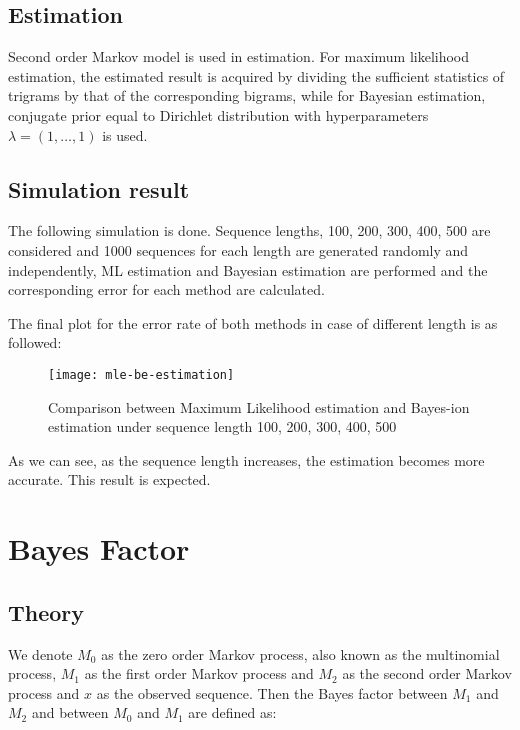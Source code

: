 \documentclass[paper=a4, fontsize=11pt]{scrartcl} %
\numberwithin{equation}{section} %
\numberwithin{figure}{section} %
\numberwithin{table}{section} %
\begin{document}
\subsection{Estimation}
Second order Markov model is used in estimation. For maximum likelihood estimation, the estimated result is acquired by dividing the sufficient statistics of trigrams by that of the corresponding bigrams, while for Bayesian estimation, conjugate prior equal to Dirichlet distribution with hyperparameters $\lambda=(1, \dots, 1)$ is used.

\subsection{Simulation result}
The following simulation is done. Sequence lengths, 100, 200, 300, 400, 500 are considered and 1000 sequences for each length are generated randomly and independently, ML estimation and Bayesian estimation are performed and the corresponding error for each method are calculated.

The final plot for the error rate of both methods in case of different length is as followed:

\begin{figure}[H]
  \centering
  \texttt{[image: mle-be-estimation]}
  \caption{Comparison between Maximum Likelihood estimation and Bayes-ion estimation under sequence length 100, 200, 300, 400, 500}
\end{figure}

As we can see, as the sequence length increases, the estimation becomes more accurate. This result is expected.


\section{Bayes Factor}

\subsection {Theory}

We denote $M_0$ as the zero order Markov process, also known as the multinomial process, $M_1$ as the first order Markov process and $M_2$ as the second order Markov process and $x$ as the observed sequence. Then the Bayes factor between $M_1$ and $M_2$ and between $M_0$ and $M_1$ are defined as:
\end{document}
